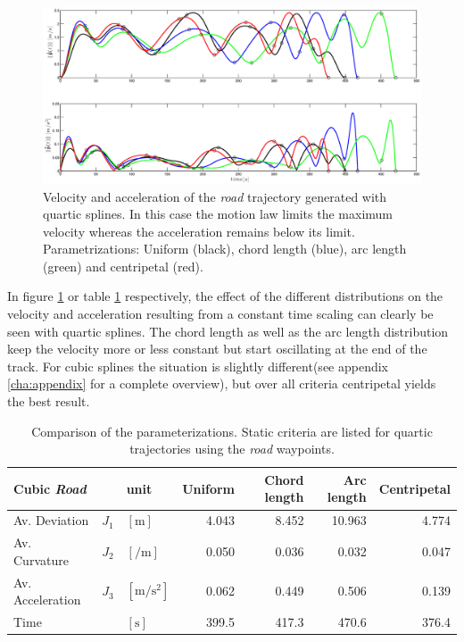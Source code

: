 \begin{figure}[H]
	\centering
    \includegraphics[width = \textwidth]{graphics/Parameterization4_road_vel_acc.eps}
  \caption{Velocity and acceleration of the \textit{road} trajectory generated with quartic splines. In this case the motion law limits the maximum velocity whereas the acceleration remains below its limit. Parametrizations: Uniform (black), chord length (blue), arc length (green) and centripetal (red).}
  \label{fig:para road vel acc}
\end{figure}

In figure \ref{fig:para road vel acc} or table \ref{tab:results_parameterization_road_quartic} respectively, the effect of the different distributions on the velocity and acceleration resulting from a constant time scaling can clearly be seen with quartic splines. The chord length as well as the arc length distribution keep the velocity more or less constant but start oscillating at the end of the track. For cubic splines the situation is slightly different(see appendix \ref{cha:appendix} for a complete overview), but over all criteria centripetal yields the best result.


\begin{table}[H]
\begin{center}
 \begin{tabular}{lll|rrrr}
 \hline
 Cubic \textit{Road} & & unit & Uniform & Chord length & Arc length & Centripetal \\ \hline \hline
 Av. Deviation  & $J_1$ & $[\si{\meter}]$    & 4.043 & 8.452 & 10.963 & 4.774 \\
 Av. Curvature & $J_2$ & $[\si{\per\meter}]$ & 0.050 & 0.036 & 0.032 & 0.047 \\
 Av. Acceleration  & $J_3$ & $[\si{\meter\per\square\second}]$ &  0.062 & 0.449 & 0.506 & 0.139 \\
 Time      &   & $[\si{\second}]$ &  399.5 & 417.3 & 470.6 & 376.4 \\
 \hline
 \end{tabular}
 \caption{Comparison of the parameterizations. Static criteria are listed for quartic trajectories using the \textit{road} waypoints.}\vspace{1ex}
 \label{tab:results_parameterization_road_quartic}
\end{center}
\end{table}

